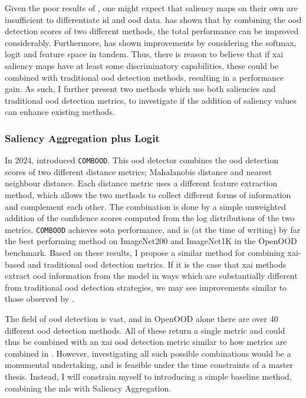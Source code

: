 \documentclass[UKenglish]{uiomasterthesis} %
\theoremstyle{definition}
\begin{document}
Given the poor results of \cite{martinez}, one might expect that saliency maps on their own are insufficient to differentiate \ac{id} and \ac{ood} data. \cite{combood} has shown that by combining the \ac{ood} detection scores of two different methods, the total performance can be improved considerably. Furthermore, \cite{vim} has shown improvements by considering the softmax, logit and feature space in tandem. Thus, there is reason to believe that if \ac{xai} saliency maps have at least some discriminatory capabilities, these could be combined with traditional \ac{ood} detection methods, resulting in a performance gain. As such, I further present two methods which use both saliencies and traditional \ac{ood} detection metrics, to investigate if the addition of saliency values can enhance existing methods.

\subsubsection{ Saliency Aggregation plus Logit} \label{section:salpluslogitmethod}

In 2024, \cite{combood} introduced \texttt{COMBOOD}. This \ac{ood} detector combines the \ac{ood} detection scores of two different distance metrics; Mahalanobis distance and nearest neighbour distance. Each distance metric uses a different feature extraction method, which allows the two methods to collect different forms of information and complement each other. The combination is done by a simple unweighted addition of the confidence scores computed from the log distributions of the two metrics. \texttt{COMBOOD} achieves \ac{sota} performance, and is (at the time of writing) by far the best performing method on ImageNet200 and ImageNet1K in the OpenOOD benchmark. Based on these results, I propose a similar method for combining \ac{xai}-based and traditional \ac{ood} detection metrics. If it is the case that \ac{xai} methods extract \ac{ood} information from the model in ways which are substantially different from traditional \ac{ood} detection strategies, we may see improvements similar to those observed by \cite{combood}.

The field of \ac{ood} detection is vast, and in OpenOOD alone there are over 40 different \ac{ood} detection methods. All of these return a single metric and could thus be combined with an \ac{xai} \ac{ood} detection metric similar to how metrics are combined in \cite{combood}. However, investigating all such possible combinations would be a monumental undertaking, and is feasible under the time constraints of a master thesis. Instead, I will constrain myself to introducing a simple baseline method, combining the \ac{mls} with Saliency Aggregation.
\end{document}
